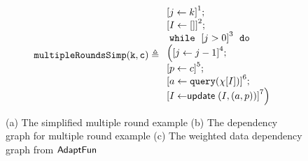 %
\begin{figure}
\centering
\begin{subfigure}{0.3\textwidth}
    \begin{centering}
    $
\kw{multipleRoundsSimp(k, c)} \triangleq
\begin{array}{l}
     \left[j \leftarrow k \right]^1 ; \\
    \left[I \leftarrow [] \right]^2; \\
    \ewhile ~ \clabel{j > 0}^{3} ~ \edo ~ \\
    \Big(
    \clabel{\assign{j}{j-1}}^{4} ;\\
    \left[p \leftarrow c \right]^5; \\
    \left[ a \leftarrow \query (\chi[I]) \right]^6;\\
    \left[I \leftarrow \mathrel{\mathsf{update}} ( {I}, (a, p))  \right]^7
    \Big) 
\end{array}
    $
    \caption{}
    \end{centering}
    \end{subfigure}
    \begin{subfigure}{0.3\textwidth}
    \begin{centering}
\caption{}
    \end{centering}
    \end{subfigure}
    \begin{subfigure}{0.33\textwidth}
    \begin{centering}
    \caption{}
    \end{centering}
    \end{subfigure}
    \vspace{-0.4cm}
    \caption{(a) The simplified multiple round example (b) The dependency graph for multiple round example (c) The weighted data dependency graph from $\textsf{AdaptFun}$}
    \vspace{-0.2cm}
    \label{fig:multi_graphs}
\end{figure}
